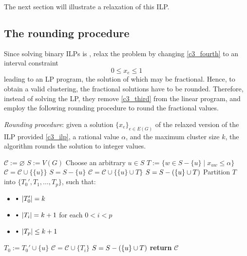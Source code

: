 The next section will illustrate a relaxation of this ILP.

\subsection{The rounding procedure}

Since solving binary ILPs is \NPComplete \cite{karp}, \textcite{c3} relax the problem by changing \cref{c3_fourth} to an interval constraint $$0 \le x_e \le 1$$ leading to an LP program, the solution of which may be fractional. Hence, to obtain a valid clustering, the fractional solutions have to be rounded. Therefore, instead of solving the LP, they remove \cref{c3_third} from the linear program, and employ the following rounding procedure to round the fractional values.

\begin{algorithm}[H]
    \caption{
        \textit{Rounding procedure}: given a solution $\{x_e\}_{e \in E(G)}$ of the relaxed version of the ILP provided \cref{c3_ilp}, a rational value $\alpha$, and the maximum cluster size $k$, the algorithm rounds the solution to integer values.
    }

        \label{rounding_procedure}
    \begin{algorithmic}[1]
            \State $\mathcal C := \varnothing$ 
            \State $S := V(G)$
                \State Choose an arbitrary $u \in S$ 
                \State $T := \{w \in S - \{u\} \mid x_{uw} \le \alpha\}$ 
                    \State $\mathcal C = \mathcal C \cup \{\{u\}\}$ 
                    \State $S = S - \{u\}$
                    \State $\mathcal C = \mathcal C \cup \{\{u\} \cup T\}$ 
                    \State $S = S - \left(\{u\} \cup T\right)$
                \Else
            \State Partition $T$ into $\{T_0', T_1, \ldots, T_p\}$, such that: \begin{itemize} \item[] \quad \quad \quad \quad $\sbullet \ \abs{T_0'} = k$ \item[] \quad \quad \quad \quad $\sbullet \ \abs{T_i} = k + 1$ for each $0 < i < p$ \item[] \quad \quad \quad \quad $\sbullet \ \abs{T_p} \le k + 1$ \end{itemize}
                    \State $T_0 := T_0' \cup \{u\}$ 
                        \State $\mathcal C = \mathcal C \cup \{T_i\}$ 
                    \EndFor
                    \State $S = S - \left(\{u\} \cup T\right)$
                \EndIf
            \EndWhile
            \State \textbf{return} $\mathcal C$
        \EndFunction
    \end{algorithmic}
\end{algorithm}

